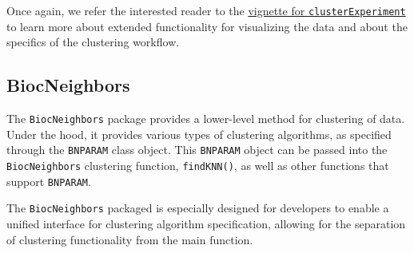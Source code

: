 \documentclass[]{book}
\begin{document}
Once again, we refer the interested reader to the \href{https://bioconductor.org/packages/release/bioc/html/clusterExperiment.html}{vignette for \texttt{clusterExperiment}} to learn more about extended functionality for visualizing the data and about the specifics of the clustering workflow.

\hypertarget{biocneighbors}{%
\subsection{BiocNeighbors}\label{biocneighbors}}

The \texttt{BiocNeighbors} package provides a lower-level method for clustering of data. Under the hood, it provides various types of clustering algorithms, as specified through the \texttt{BNPARAM} class object. This \texttt{BNPARAM} object can be passed into the \texttt{BiocNeighbors} clustering function, \texttt{findKNN()}, as well as other functions that support \texttt{BNPARAM}.

The \texttt{BiocNeighbors} packaged is especially designed for developers to enable a unified interface for clustering algorithm specification, allowing for the separation of clustering functionality from the main function.


\end{document}
